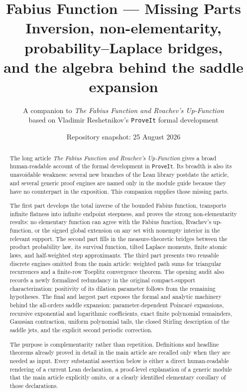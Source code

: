 \documentclass[11pt,oneside]{article}
\title{\bfseries Fabius Function --- Missing Parts\\[0.35em]
\large Inversion, non-elementarity, probability--Laplace bridges,\\
and the algebra behind the saddle expansion}
\author{A companion to \emph{The Fabius Function and Rvachev's Up-Function}\\
\small based on Vladimir Reshetnikov's \texttt{ProveIt} formal development}
\date{Repository snapshot: 25 August 2026}
\theoremstyle{definition}
\theoremstyle{remark}
\begin{document}
\maketitle

\begin{abstract}
The long article \emph{The Fabius Function and Rvachev's Up-Function} gives a broad
human-readable account of the formal development in \texttt{ProveIt}.  Its breadth is also
its unavoidable weakness: several new branches of the Lean library postdate the article,
and several generic proof engines are named only in the module guide because they have no
counterpart in the exposition.  This companion supplies those missing parts.

The first part develops the total inverse of the bounded Fabius function, transports
infinite flatness into infinite endpoint steepness, and proves the strong non-elementarity
results: no elementary function can agree with the Fabius function, Rvachev's up-function,
or the signed global extension on any set with nonempty interior in the relevant support.
The second part fills in the measure-theoretic bridges between the product probability law,
its survival function, tilted Laplace moments, finite atomic laws, and half-weighted step
approximants.  The third part presents two reusable discrete engines omitted from the main
article: weighted path sums for triangular recurrences and a finite-row Toeplitz convergence
theorem.  The opening audit also records a newly formalized redundancy in the original
compact-support characterization: positivity of its dilation parameter follows from the
remaining hypotheses.  The final and largest part exposes the formal and analytic machinery behind the
all-orders saddle expansion: parameter-dependent Poincar\'e expansions, recursive
exponential and logarithmic coefficients, exact finite polynomial remainders, Gaussian
contraction, uniform polynomial tails, the closed Stirling description of the saddle jets,
and the explicit second periodic correction.

The purpose is complementarity rather than repetition.  Definitions and headline theorems
already proved in detail in the main article are recalled only when they are needed as input.
Every substantial assertion below is either a direct human-readable rendering of a current
Lean declaration, a proof-level explanation of a generic module that the main article
explicitly omits, or a clearly identified elementary corollary of those declarations.
\end{abstract}
\end{document}
